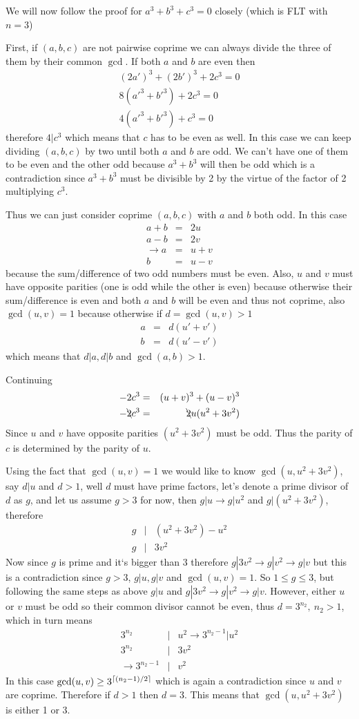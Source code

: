 \documentclass[aps,preprint,preprintnumbers,nofootinbib,showpacs,prd]{revtex4-1}
\newcommand{\nbea}{\begin{eqnarray*}}
\newcommand{\neea}{\end{eqnarray*}}
\DeclarePairedDelimiter{\ceil}{\lceil}{\rceil}
\begin{document}
We will now follow the proof for $a^3 + b^3 + c^3 = 0$ closely (which is FLT with $n=3$)

First, if $(a,b,c)$ are not pairwise coprime we can always divide the three of them by their common $\gcd$. If both $a$ and $b$ are even then
%
\nbea
(2a')^3 + (2b')^3 + 2c^3 = 0 \\
8(a'^3 + b'^3) + 2c^3 = 0 \\
4(a'^3 + b'^3) + c^3 = 0
\neea
%
therefore $4|c^3$ which means that $c$ has to be even as well. In this case we can keep dividing $(a,b,c)$ by two until both $a$ and $b$ are odd. We can't have one of them to be even and the other odd because $a^3 + b^3$ will then be odd which is a contradiction since $a^3 + b^3$ must be divisible by 2 by the virtue of the factor of 2 multiplying $c^3$.

Thus we can just consider coprime $(a,b,c)$ with $a$ and $b$ both odd. In this case
%
\nbea
a + b & = & 2u \\
a - b & = & 2v \\
\to a & = & u + v \\
b & = & u - v
\neea
%
because the sum/difference of two odd numbers must be even. Also, $u$ and $v$ must have opposite parities (one is odd while the other is even) because otherwise their sum/difference is even and both $a$ and $b$ will be even and thus not coprime, also $\gcd(u,v) = 1$ because otherwise if $d = \gcd(u,v) > 1$
%
\nbea
a & = & d(u' + v') \\
b & = & d(u' - v')
\neea
%
which means that $d|a, d|b$ and $\gcd(a,b) > 1$. 

Continuing
%
\nbea
-2c^3 & = & (u + v)^3 + (u - v)^3 \\
-\bcancel{2}c^3 & = & \bcancel{2}u(u^2 + 3v^2)
\neea
%
Since $u$ and $v$ have opposite parities $(u^2 + 3v^2)$ must be odd. Thus the parity of $c$ is determined by the parity of $u$.

Using the fact that $\gcd(u,v)=1$ we would like to know $\gcd(u, u^2 + 3v^2)$, say $d|u$ and $d > 1$, well $d$ must have prime factors, let's denote a prime divisor of $d$ as $g$, and let us assume $g > 3$ for now, then $g | u \to g |u^2$ and $g | (u^2 + 3v^2)$, therefore
%
\nbea
g &|& (u^2 + 3v^2) - u^2 \\
g &|& 3v^2
\neea
%
Now since $g$ is prime and it`s bigger than $3$ therefore $g | 3v^2 \to g|v^2 \to g |v$ but this is a contradiction since $g > 3$, $g|u, g|v$ and $\gcd(u,v)=1$. So $1 \le g \le 3$, but following the same steps as above $g|u$ and $g | 3v^2 \to g|v^2 \to g |v$. However, either $u$ or $v$ must be odd so their common divisor cannot be even, thus $d = 3^{n_2},~n_2 > 1$, which in turn means
%
\nbea
3^{n_2} &|& u^2 \to 3^{n_2-1} | u^2 \\
3^{n_2} &|& 3v^2 \\
\to 3^{n_2-1} &|& v^2
\neea
%
In this case $\gcd(u,v) \ge 3^{\ceil{(n_2-1)/2}}$ which is again a contradiction since $u$ and $v$ are coprime. Therefore if $d > 1$ then $d=3$. This means that $\gcd(u, u^2 + 3v^2)$ is either 1 or 3.
\end{document}
